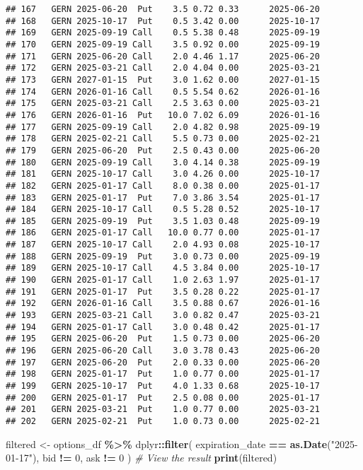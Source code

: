 \documentclass[
]{article}
\newenvironment{Shaded}{\begin{snugshade}}{\end{snugshade}}
\newcommand{\CommentTok}[1]{\textcolor[rgb]{0.56,0.35,0.01}{\textit{#1}}}
\newcommand{\DecValTok}[1]{\textcolor[rgb]{0.00,0.00,0.81}{#1}}
\newcommand{\FunctionTok}[1]{\textcolor[rgb]{0.13,0.29,0.53}{\textbf{#1}}}
\newcommand{\NormalTok}[1]{#1}
\newcommand{\OtherTok}[1]{\textcolor[rgb]{0.56,0.35,0.01}{#1}}
\newcommand{\SpecialCharTok}[1]{\textcolor[rgb]{0.81,0.36,0.00}{\textbf{#1}}}
\newcommand{\StringTok}[1]{\textcolor[rgb]{0.31,0.60,0.02}{#1}}
\begin{document}
\begin{verbatim}
## 167   GERN 2025-06-20  Put    3.5 0.72 0.33      2025-06-20
## 168   GERN 2025-10-17  Put    0.5 3.42 0.00      2025-10-17
## 169   GERN 2025-09-19 Call    0.5 5.38 0.48      2025-09-19
## 170   GERN 2025-09-19 Call    3.5 0.92 0.00      2025-09-19
## 171   GERN 2025-06-20 Call    2.0 4.46 1.17      2025-06-20
## 172   GERN 2025-03-21 Call    2.0 4.04 0.00      2025-03-21
## 173   GERN 2027-01-15  Put    3.0 1.62 0.00      2027-01-15
## 174   GERN 2026-01-16 Call    0.5 5.54 0.62      2026-01-16
## 175   GERN 2025-03-21 Call    2.5 3.63 0.00      2025-03-21
## 176   GERN 2026-01-16  Put   10.0 7.02 6.09      2026-01-16
## 177   GERN 2025-09-19 Call    2.0 4.82 0.98      2025-09-19
## 178   GERN 2025-02-21 Call    5.5 0.73 0.00      2025-02-21
## 179   GERN 2025-06-20  Put    2.5 0.43 0.00      2025-06-20
## 180   GERN 2025-09-19 Call    3.0 4.14 0.38      2025-09-19
## 181   GERN 2025-10-17 Call    3.0 4.26 0.00      2025-10-17
## 182   GERN 2025-01-17 Call    8.0 0.38 0.00      2025-01-17
## 183   GERN 2025-01-17  Put    7.0 3.86 3.54      2025-01-17
## 184   GERN 2025-10-17 Call    0.5 5.28 0.52      2025-10-17
## 185   GERN 2025-09-19  Put    3.5 1.03 0.48      2025-09-19
## 186   GERN 2025-01-17 Call   10.0 0.77 0.00      2025-01-17
## 187   GERN 2025-10-17 Call    2.0 4.93 0.08      2025-10-17
## 188   GERN 2025-09-19  Put    3.0 0.73 0.00      2025-09-19
## 189   GERN 2025-10-17 Call    4.5 3.84 0.00      2025-10-17
## 190   GERN 2025-01-17 Call    1.0 2.63 1.97      2025-01-17
## 191   GERN 2025-01-17  Put    3.5 0.28 0.22      2025-01-17
## 192   GERN 2026-01-16 Call    3.5 0.88 0.67      2026-01-16
## 193   GERN 2025-03-21 Call    3.0 0.82 0.47      2025-03-21
## 194   GERN 2025-01-17 Call    3.0 0.48 0.42      2025-01-17
## 195   GERN 2025-06-20  Put    1.5 0.73 0.00      2025-06-20
## 196   GERN 2025-06-20 Call    3.0 3.78 0.43      2025-06-20
## 197   GERN 2025-06-20  Put    2.0 0.33 0.00      2025-06-20
## 198   GERN 2025-01-17  Put    1.0 0.77 0.00      2025-01-17
## 199   GERN 2025-10-17  Put    4.0 1.33 0.68      2025-10-17
## 200   GERN 2025-01-17  Put    2.5 0.08 0.00      2025-01-17
## 201   GERN 2025-03-21  Put    1.0 0.77 0.00      2025-03-21
## 202   GERN 2025-02-21  Put    1.0 0.73 0.00      2025-02-21
\end{verbatim}

\begin{Shaded}
\begin{Highlighting}[]
\NormalTok{filtered }\OtherTok{\textless{}{-}}\NormalTok{ options\_df }\SpecialCharTok{\%\textgreater{}\%}
\NormalTok{  dplyr}\SpecialCharTok{::}\FunctionTok{filter}\NormalTok{(}
\NormalTok{    expiration\_date }\SpecialCharTok{==} \FunctionTok{as.Date}\NormalTok{(}\StringTok{"2025{-}01{-}17"}\NormalTok{),}
\NormalTok{    bid }\SpecialCharTok{!=} \DecValTok{0}\NormalTok{,}
\NormalTok{    ask }\SpecialCharTok{!=} \DecValTok{0}
\NormalTok{  )}
\CommentTok{\# View the result}
\FunctionTok{print}\NormalTok{(filtered)}
\end{Highlighting}
\end{Shaded}
\end{document}

